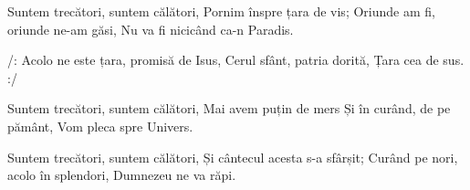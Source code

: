 \beginverse
Suntem trecători, suntem călători,
Pornim înspre țara de vis;
Oriunde am fi, oriunde ne-am găsi,
Nu va fi nicicând ca-n Paradis.
\endverse

\beginchorus
/: Acolo ne este țara, promisă de Isus,
Cerul sfânt, patria dorită,
Țara cea de sus. :/
\endchorus

\beginverse
Suntem trecători, suntem călători,
Mai avem puțin de mers
Și în curând, de pe pământ,
Vom pleca spre Univers.
\endverse

\beginverse
Suntem trecători, suntem călători,
Și cântecul acesta s-a sfârșit;
Curând pe nori, acolo în splendori,
Dumnezeu ne va răpi.
\endverse
\endsong